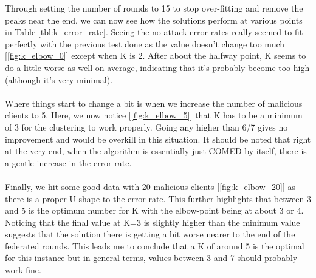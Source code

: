 Through setting the number of rounds to 15 to stop over-fitting and remove the peaks near the end, we can now see how the solutions perform at various points in Table \ref{tbl:k_error_rate}.
Seeing the no attack error rates really seemed to fit perfectly with the previous test done as the value doesn't change too much [\ref{fig:k_elbow_0}] except when K is 2.
After about the halfway point, K seems to do a little worse as well on average, indicating that it's probably become too high (although it's very minimal).
\\ \\
Where things start to change a bit is when we increase the number of malicious clients to 5.
Here, we now notice [\ref{fig:k_elbow_5}] that K has to be a minimum of 3 for the clustering to work properly.
Going any higher than 6/7 gives no improvement and would be overkill in this situation.
It should be noted that right at the very end, when the algorithm is essentially just COMED by itself, there is a gentle increase in the error rate.
\\ \\
Finally, we hit some good data with 20 malicious clients [\ref{fig:k_elbow_20}] as there is a proper U-shape to the error rate.
This further highlights that between 3 and 5 is the optimum number for K with the elbow-point being at about 3 or 4.
Noticing that the final value at K=3 is slightly higher than the minimum value suggests that the solution there is getting a bit worse nearer to the end of the federated rounds.
This leads me to conclude that a K of around 5 is the optimal for this instance but in general terms, values between 3 and 7 should probably work fine.




